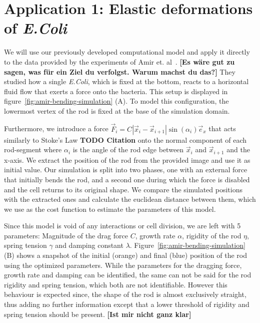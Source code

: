 \documentclass{article}
\begin{document}
\section{Application 1: Elastic deformations of \textit{E.Coli}}
\label{section:application-1}

We will use our previously developed computational model and apply it directly to the data provided
by the experiments of Amir et. al~\cite{Amir2014,Amir2014_2}.
\textbf{[Es wäre gut zu sagen, was für ein Ziel du verfolgst. Warum machst du das?]}
They studied how a single \textit{E.Coli}, which is fixed at the bottom, reacts to a horizontal
fluid flow that exerts a force onto the bacteria.
This setup is displayed in figure~\ref{fig:amir-bending-simulation} (A).
To model this configuration, the lowermost vertex of the rod is fixed at the base of the simulation
domain.

Furthermore, we introduce a force $\vec{F}_i = C |\vec{x}_i - \vec{x}_{i+1}|\sin(\alpha_i)\vec{e}_x$
that acts similarly to Stoke's Law \textbf{TODO Citation} onto the normal component of each
rod-segment where $\alpha_i$ is the angle of the rod edge between $\vec{x}_i$ and $\vec{x}_{i+1}$
and the x-axis.
We extract the position of the rod from the provided image and use it as initial value.
Our simulation is split into two phases, one with an external force that initially bends the rod,
and a second one during which the force is disabled and the cell returns to its original shape.
We compare the simulated positions with the extracted ones and calculate the euclidean distance
between them, which we use as the cost function to estimate the parameters of this model.

Since this model is void of any interactions or cell division, we are left with 5 parameters:
Magnitude of the drag force $C$, growth rate $\alpha$, rigidity of the rod $\eta$, spring tension
$\gamma$ and damping constant $\lambda$.
Figure~\ref{fig:amir-bending-simulation} (B) shows a snapshot of the initial (orange) and final
(blue) position of the rod using the optimized parameters.
While the parameters for the dragging force, growth rate and damping can be identified, the same
can not be said for the rod rigidity and spring tension, which both are not identifiable.
However this behaviour is expected since, the shape of the rod is almost exclusively straight, thus
adding no further information except that a lower threshold of rigidity and spring tension should be
present.
\textbf{[Ist mir nicht ganz klar]}
\end{document}
